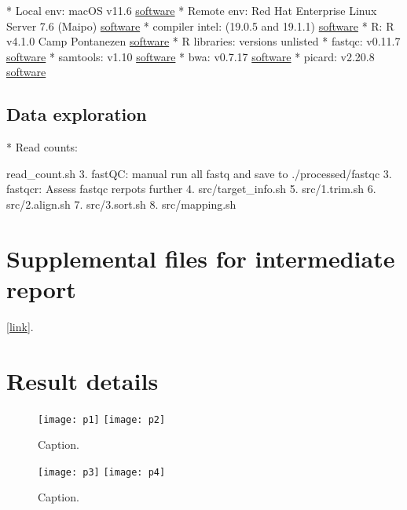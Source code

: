 \documentclass{article}
\begin{document}
\begin{markdown}
* Local env: macOS v11.6 \href{https://support.apple.com/macos}{software}
* Remote env: Red Hat Enterprise Linux Server 7.6 (Maipo)  \href{https://www.redhat.com/en/technologies/linux-platforms/enterprise-linux}{software}
* compiler intel: (19.0.5 and 19.1.1)
\href{https://www.intel.com/content/www/us/en/developer/tools/oneapi/commercial-base-hpc.html#gs.ppyt3x}{software}
* R: R v4.1.0 Camp Pontanezen  \href{https://www.r-project.org}{software}
* R libraries: versions unlisted
* fastqc: v0.11.7 \href{https://www.bioinformatics.babraham.ac.uk/projects/fastqc/}{software}
* samtools: v1.10 \href{https://www.htslib.org}{software}
* bwa: v0.7.17 \href{https://janis.readthedocs.io/en/latest/tools/bioinformatics/bwa/bwamem.html}{software}
* picard: v2.20.8  \href{http://broadinstitute.github.io/picard/}{software}

\subsection{Data exploration}
* Read counts: 

read_count.sh
3. fastQC: manual run all fastq and save to ./processed/fastqc
3. fastqcr: Assess fastqc rerpots further
4. src/target_info.sh
5. src/1.trim.sh
6. src/2.align.sh
7. src/3.sort.sh
8. src/mapping.sh



\section{Supplemental files for intermediate report}
 [\href{https://github.com/DylanLawless/kit_assess/data/processed/}{link}].
 

\section{Result details}

\begin{figure}[ht] \hspace*{0cm} 
\begin{center}
    \texttt{[image: p1]}
    \texttt{[image: p2]}
	\caption{Caption.}
	\label{fig:p1p2}
\end{center}
\end{figure}

\begin{figure}[ht] \hspace*{0cm} 
\begin{center}
    \texttt{[image: p3]}
    \texttt{[image: p4]}
	\caption{Caption.}
	\label{fig:p3p4}
\end{center}
\end{figure}


\end{markdown}
\end{document}
